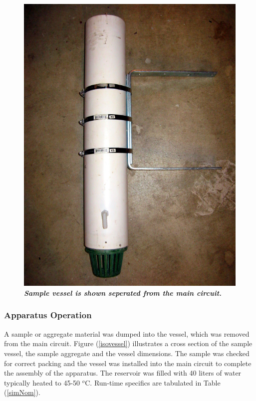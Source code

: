 \documentclass[12pt]{article}
\numberwithin{equation}{section}
\numberwithin{table}{section}
\numberwithin{figure}{section}
\begin{document}
\begin{figure}
\centering\includegraphics[scale=1.25]{vesselPhoto.jpg}
\caption[Sample Vessel]{\textbf{\emph{Sample vessel is shown seperated from the main circuit.}}\label{vesselPhoto}}
\end{figure}

\subsubsection{Apparatus Operation}
A sample or aggregate material was dumped into the vessel, which was removed from the main circuit. Figure (\ref{isovessel}) illustrates a cross section of the sample vessel, the sample aggregate and the vessel dimensions. The sample was checked for correct packing and the vessel was installed into the main circuit to complete the assembly of the apparatus. The reservoir was filled with 40 liters of water typically heated to 45-50 $^{o}$C. Run-time specifics are tabulated in Table (\ref{simNom}).
\end{document}
